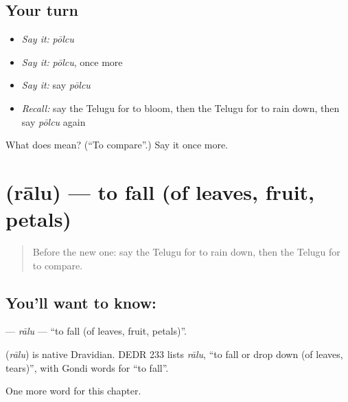 \subsection*{Your turn}
\begin{itemize}
\raggedright
  \item \emph{Say it:} \emph{pōlcu}
  \item \emph{Say it:} \emph{pōlcu}, once more
  \item \emph{Say it:} say \emph{pōlcu}
  \item \emph{Recall:} say the Telugu for to bloom, then the Telugu for to rain down, then say \emph{pōlcu} again
\end{itemize}

\begin{tcolorbox}[breakable,colback=teal!4,colframe=teal!35!black,title={Before you move on}]
What does  mean? (\textquotedblleft{}To compare\textquotedblright{}.) Say it once more.
\end{tcolorbox}
\section[\texorpdfstring{\te{రాలు} (rālu)}{రాలు (rālu)}]{ (rālu) — to fall (of leaves, fruit, petals)}

\label{lesson:TE-C204-ralu}



\begin{quote}
Before the new one: say the Telugu for to rain down, then the Telugu for to compare.
\end{quote}

\subsection*{You'll want to know: }
\textbf{} — \emph{rālu} — \textquotedblleft{}to fall (of leaves, fruit, petals)\textquotedblright{}.

\begin{cousinweb}
\textbf{} (\emph{rālu}) is native Dravidian. DEDR 233 lists \emph{rālu}, \textquotedblleft{}to fall or drop down (of leaves, tears)\textquotedblright{}, with Gondi words for \textquotedblleft{}to fall\textquotedblright{}.
\end{cousinweb}

\begin{grammarlens}[title={What you've built}]
One more word for this chapter.
\end{grammarlens}


